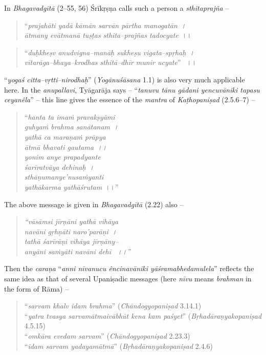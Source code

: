 In \textit{Bhagavadgītā} (2–55, 56) Śrīkṛṣṇa calls such a person a \textit{sthitaprajña} –

\begin{verse}
“\textit{prajahāti yadā kāmān sarvān pārtha manogatān~।}\\\textit{ātmany evātmanā tuṣṭas sthita–prajñas tadocyate}~।।
\end{verse}

\begin{verse}
“\textit{duḥkheṣv anudvigna–manāḥ sukheṣu vigata–spṛhaḥ~।}\\\textit{vītarāga–bhaya–krodhas sthitā–dhīr munir ucyate}”  ।।
\end{verse}

“\textit{yogaś citta–vṛtti–nirodhaḥ}” (\textit{Yogānuśāsana} 1.1) is also very much applicable here. In the \textit{anupallavi}, Tyāgarāja says – “\textit{tanuvu tānu gādani yencuvāniki tapasu ceyanêla}” – this line gives the essence of the \textit{mantra} of \textit{Kaṭhopaniṣad} (2.5.6–7) –

\begin{verse}
“\textit{hanta ta imaṁ pravakṣyāmi}\\\textit{guhyaṁ brahma sanātanam~।}\\\textit{yathā ca maraṇaṁ prāpya}\\\textit{ātmā bhavati gautama~।।}\\\textit{yonim anye prapadyante}\\\textit{śarīratvāya dehinaḥ~।}\\\textit{sthāṇumanye’nusaṁyanti}\\\textit{yathākarma yathāśrutam}~।।”
\end{verse}

The above message is given in \textit{Bhagavadgītā} (2.22) also –

\begin{verse}
\textit{“vāsāmsi jīrṇāni yathā vihāya}\\\textit{navāni gṛhṇāti naro’parāṇi~।}\\\textit{tathā śarīrāṇi vihāya jīrṇāny–}\\\textit{anyāni saṁyāti navāni dehī  ।।”}
\end{verse}

Then the \textit{caraṇa} “\textit{anni nīvanucu êncinavāniki yāśramabhedamulela}” reflects the same idea as that of several Upaniṣadic messages (here \textit{nīvu} means \textit{brahman} in the form of Rāma) –

\begin{verse}
“\textit{sarvam khalv idam brahma}” (\textit{Chāndogyopaniṣad} 3.14.1)\\ “\textit{yatra tvasya sarvamātmaivābhūt kena kam paśyet}” (\textit{Bṛhadāraṇyakopaniṣad} 4.5.15)\\ “\textit{omkāra evedam sarvam}” (\textit{Chāndogyopaniṣad} 2.23.3)\\ “\textit{idam sarvam yadayamātmā}” (\textit{Bṛhadāraṇyakopaniṣad} 2.4.6)
\end{verse}


